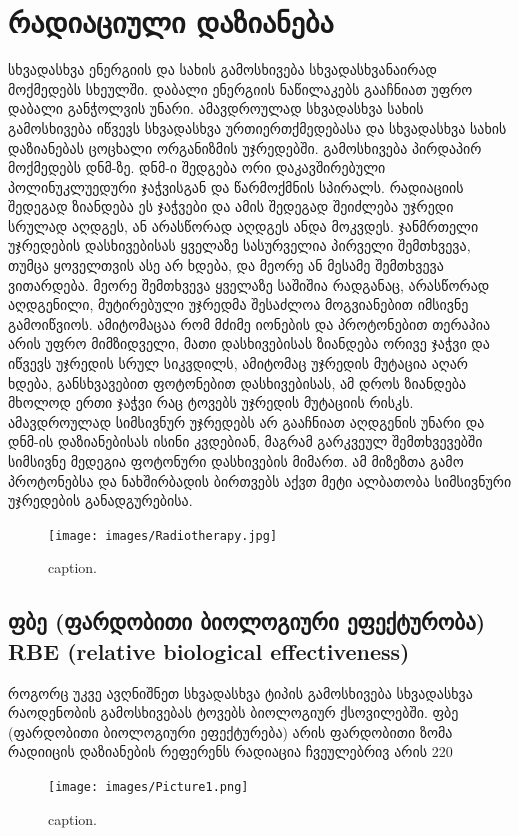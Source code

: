\documentclass[12pt,a4paper,]{report}
\begin{document}
\section{რადიაციული დაზიანება}
სხვადასხვა ენერგიის და სახის გამოსხივება სხვადასხვანაირად მოქმედებს სხეულში. დაბალი ენერგიის ნაწილაკებს გააჩნიათ უფრო დაბალი განჭოლვის უნარი. ამავდროულად სხვადასხვა სახის გამოსხივება იწვევს სხვადასხვა ურთიერთქმედებასა და  სხვადასხვა სახის დაზიანებას ცოცხალი ორგანიზმის უჯრედებში. გამოსხივება პირდაპირ მოქმედებს დნმ-ზე. დნმ-ი შედგება ორი დაკავშირებული პოლინუკლუედური ჯაჭვისგან და წარმოქმნის სპირალს. რადიაციის შედეგად ზიანდება ეს ჯაჭვები და ამის შედეგად შეიძლება უჯრედი სრულად აღდგეს, ან არასწორად აღდგეს ანდა მოკვდეს. ჯანმრთელი უჯრედების დასხივებისას ყველაზე სასურველია პირველი შემთხვევა, თუმცა ყოველთვის ასე არ ხდება, და მეორე ან მესამე შემთხვევა ვითარდება. მეორე შემთხვევა ყველაზე საშიშია რადგანაც, არასწორად აღდგენილი, მუტირებული უჯრედმა შესაძლოა მოგვიანებით იმსივნე გამოიწვიოს. ამიტომაცაა რომ მძიმე იონების და პროტონებით თერაპია არის უფრო მიმზიდველი, მათი დასხივებისას ზიანდება ორივე ჯაჭვი და იწვევს უჯრედის სრულ სიკვდილს, ამიტომაც უჯრედის მუტაცია აღარ ხდება, განსხვავებით ფოტონებით დასხივებისას, ამ დროს ზიანდება მხოლოდ ერთი ჯაჭვი რაც ტოვებს უჯრედის მუტაციის რისკს. ამავდროულად სიმსივნურ უჯრედებს არ გააჩნიათ აღდგენის უნარი და დნმ-ის დაზიანებისას ისინი კვდებიან, მაგრამ გარკვეულ შემთხვევებში სიმსივნე მედეგია ფოტონური დასხივების მიმართ. ამ მიზეზთა გამო პროტონებსა და ნახშირბადის ბირთვებს აქვთ მეტი ალბათობა სიმსივნური უჯრედების განადგურებისა.

	\begin{figure}[htp]
	    \centering
        \texttt{[image: images/Radiotherapy.jpg]}
        \caption{caption.}
        \label{fig:1}
    \end{figure}

    \subsection{ფბე (ფარდობითი ბიოლოგიური ეფექტურობა) RBE (relative biological effectiveness)} 
როგორც უკვე ავღნიშნეთ სხვადასხვა ტიპის გამოსხივება სხვადასხვა რაოდენობის გამოსხივებას ტოვებს ბიოლოგიურ ქსოვილებში. ფბე (ფარდობითი ბიოლოგიური ეფექტურება) არის ფარდობითი ზომა რადიიცის დაზიანების
რეფერენს რადიაცია ჩვეულებრივ არის 220 


	\begin{figure}[htp]
	    \centering
        \texttt{[image: images/Picture1.png]}
        \caption{caption.}
        \label{fig:1}
    \end{figure}
\end{document}
